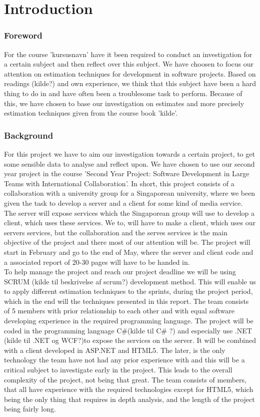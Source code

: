\part{Introduction}
\section{Foreword}
For the course 'kursusnavn' have it been required to conduct an investigation for a certain subject and then reflect over this subject. We have choosen to focus our attention on estimation techniques for development in software projects. Based on readings (kilde?) and own experience, we think that this subject have been a hard thing to do in and have often been a  troublesome task to perform. Because of this, we have chosen to base our investigation on estimates and more precisely estimation techniques given from the course book 'kilde'. 

\section{Background}
For this project we have to aim our investigation towards a certain project, to get some sensible data to analyse and reflect upon. We have chosen to use our second year project in the course 'Second Year Project: Software Development in Large Teams with International Collaboration'. In short, this project consists of a collaboration with a university group for a Singaporean university, where we been given the task to develop a server and a client for some kind of media service. The server will expose services which the Singaporean group will use to develop a client, which uses these services. We to, will have to make a client, which uses our servers services, but the collaboration and the serves services is the main objective of the project and there most of our attention will be. The project will start in February and go to the end of May, where the server and client code and a associated report of 20-30 pages will have to be handed in. \\ 

To help manage the project and reach our project deadline we will be using SCRUM (kilde til beskrivelse af scrum?) development method. This will enable us to apply different estimation techniques to the sprints, during the project period, which in the end will the techniques presented in this report. The team consists of 5 members with prior relationship to each other and with equal software developing experience in the required programming language. The project will be coded in the programming language C\#(kilde til C\# ?) and especially use .NET (kilde til .NET og WCF?)to expose the services on the server. It will be combined with a client developed in ASP.NET and HTML5. The later, is the only technology the team have not had any prior experience with and this will be a critical subject to investigate early in the project.  This leads to the overall complexity of the project, not being that great. The team consists of members, that all have experience with the required technologies except for HTML5, which being the only thing that requires in depth analysis, and the length of the project being fairly long.\\

